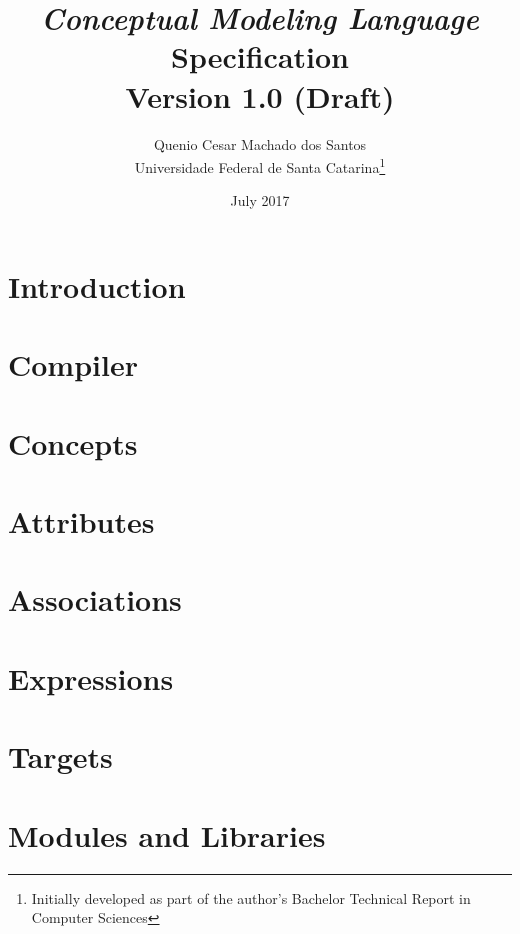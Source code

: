 \documentclass[a4paper,oneside,14pt, extrafontsizes]{memoir}
\title{\emph{Conceptual Modeling Language}\\Specification\\ \small{Version 1.0 (Draft)}}
\author{Quenio Cesar Machado dos Santos\\
\small{Universidade Federal de Santa Catarina}\thanks{
Initially developed as part of the author's Bachelor Technical Report in Computer Sciences}}
\date{July 2017}
\begin{document}
\begin{titlingpage}
\maketitle
\end{titlingpage}

\frontmatter

\begin{KeepFromToc}

\clearpage
\tableofcontents

\clearpage
\listoffigures

\clearpage
\listoftables

\end{KeepFromToc}

\mainmatter

\chapter{Introduction}


\chapter{Compiler}
\label{ch:compiler}


\chapter{Concepts}


\chapter{Attributes}


\chapter{Associations}


\chapter{Expressions}

\chapter{Targets}
\label{ch:targets}

\chapter{Modules and Libraries}
\end{document}

